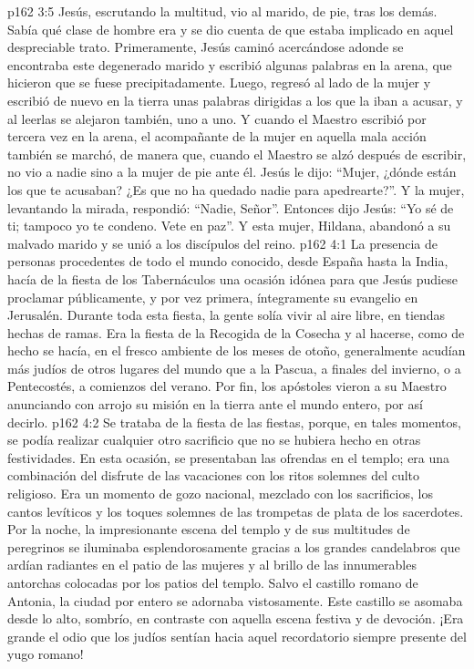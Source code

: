 \vs p162 3:5 Jesús, escrutando la multitud, vio al marido, de pie, tras los demás. Sabía qué clase de hombre era y se dio cuenta de que estaba implicado en aquel despreciable trato. Primeramente, Jesús caminó acercándose adonde se encontraba este degenerado marido y escribió algunas palabras en la arena, que hicieron que se fuese precipitadamente. Luego, regresó al lado de la mujer y escribió de nuevo en la tierra unas palabras dirigidas a los que la iban a acusar, y al leerlas se alejaron también, uno a uno. Y cuando el Maestro escribió por tercera vez en la arena, el acompañante de la mujer en aquella mala acción también se marchó, de manera que, cuando el Maestro se alzó después de escribir, no vio a nadie sino a la mujer de pie ante él. Jesús le dijo: “Mujer, ¿dónde están los que te acusaban? ¿Es que no ha quedado nadie para apedrearte?”. Y la mujer, levantando la mirada, respondió: “Nadie, Señor”. Entonces dijo Jesús: “Yo sé de ti; tampoco yo te condeno. Vete en paz”. Y esta mujer, Hildana, abandonó a su malvado marido y se unió a los discípulos del reino.
\vs p162 4:1 La presencia de personas procedentes de todo el mundo conocido, desde España hasta la India, hacía de la fiesta de los Tabernáculos una ocasión idónea para que Jesús pudiese proclamar públicamente, y por vez primera, íntegramente su evangelio en Jerusalén. Durante toda esta fiesta, la gente solía vivir al aire libre, en tiendas hechas de ramas. Era la fiesta de la Recogida de la Cosecha y al hacerse, como de hecho se hacía, en el fresco ambiente de los meses de otoño, generalmente acudían más judíos de otros lugares del mundo que a la Pascua, a finales del invierno, o a Pentecostés, a comienzos del verano. Por fin, los apóstoles vieron a su Maestro anunciando con arrojo su misión en la tierra ante el mundo entero, por así decirlo.
\vs p162 4:2 Se trataba de la fiesta de las fiestas, porque, en tales momentos, se podía realizar cualquier otro sacrificio que no se hubiera hecho en otras festividades. En esta ocasión, se presentaban las ofrendas en el templo; era una combinación del disfrute de las vacaciones con los ritos solemnes del culto religioso. Era un momento de gozo nacional, mezclado con los sacrificios, los cantos levíticos y los toques solemnes de las trompetas de plata de los sacerdotes. Por la noche, la impresionante escena del templo y de sus multitudes de peregrinos se iluminaba esplendorosamente gracias a los grandes candelabros que ardían radiantes en el patio de las mujeres y al brillo de las innumerables antorchas colocadas por los patios del templo. Salvo el castillo romano de Antonia, la ciudad por entero se adornaba vistosamente. Este castillo se asomaba desde lo alto, sombrío, en contraste con aquella escena festiva y de devoción. ¡Era grande el odio que los judíos sentían hacia aquel recordatorio siempre presente del yugo romano!
